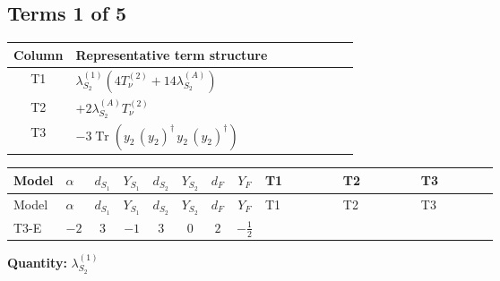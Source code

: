 \documentclass[8pt]{article}
\begin{document}
\begin{landscape}
\subsection*{Terms 1 of 5}
\begin{center}
\begin{tabular}{@{}c >{\raggedright\arraybackslash}p{0.82\linewidth}@{}}
\toprule
Column & Representative term structure \\
\midrule
T1 & \(\displaystyle {\lambda_{S_2}^{(1)}} (4 T_{\nu}^{(2)}+14 {\lambda_{S_2}^{(A)}})\) \\
\midrule
T2 & \(\displaystyle +2 {\lambda_{S_2}^{(A)}} T_{\nu}^{(2)}\) \\
\midrule
T3 & \(\displaystyle -3 \operatorname{Tr}\!\left({y_2}\,\left({y_2}\right)^{\dagger}\,{y_2}\,\left({y_2}\right)^{\dagger}\right)\) \\
\midrule
\bottomrule
\end{tabular}
\end{center}
\smallskip
\tiny
\begin{longtable}{@{}llcccccc >{\raggedright\arraybackslash}p{0.21\linewidth} >{\raggedright\arraybackslash}p{0.21\linewidth} >{\raggedright\arraybackslash}p{0.21\linewidth}@{}}
\toprule
Model & $\alpha$ & $d_{S_1}$ & $Y_{S_1}$ & $d_{S_2}$ & $Y_{S_2}$ & $d_F$ & $Y_F$ & T1 & T2 & T3 \\
\midrule
\endfirsthead
\toprule
Model & $\alpha$ & $d_{S_1}$ & $Y_{S_1}$ & $d_{S_2}$ & $Y_{S_2}$ & $d_F$ & $Y_F$ & T1 & T2 & T3 \\
\midrule
\endhead
T3-E & $-2$ & $3$ & $-1$ & $3$ & $0$ & $2$ & $-\frac{1}{2}$ & \scriptsize\adjustbox{max width=\linewidth}{$\begin{gathered} {\lambda_{S_2}^{(1)}} (4 T_{\nu}^{(2)}+14 {\lambda_{S_2}^{(A)}})\end{gathered}$} & \scriptsize\adjustbox{max width=\linewidth}{$\begin{gathered} +2 {\lambda_{S_2}^{(A)}} T_{\nu}^{(2)}\end{gathered}$} & \scriptsize\adjustbox{max width=\linewidth}{$\begin{gathered} -3 \operatorname{Tr}\!\left({y_2}\,\left({y_2}\right)^{\dagger}\,{y_2}\,\left({y_2}\right)^{\dagger}\right)\end{gathered}$} \\
\midrule
\bottomrule
\end{longtable}
\clearpage
\noindent\textbf{Quantity: }$\lambda_{S_2}^{(1)}$\par\smallskip

\end{landscape}
\end{document}

